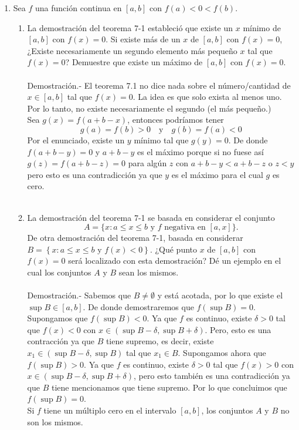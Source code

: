 \begin{enumerate}[\bfseries 1.]
\begin{enumerate}[\bfseries (a)]
	\end{enumerate}

    \item Sea $f$ una función continua en $[a,b]$ con $f(a)<0<f(b)$.

	\begin{enumerate}[\bfseries (a)]

	    \item La demostración del teorema 7-1 estableció que existe un $x$ mínimo de $[a,b]$ con $f(x)=0$. Si existe más de un $x$ de $[a,b]$ con $f(x)=0$, ¿Existe necesariamente un segundo elemento más pequeño $x$ tal que $f(x)=0$? Demuestre que existe un máximo de $[a,b]$ con $f(x)=0$.\\\\
		Demostración.-\; El teorema 7.1 no dice nada sobre el número/cantidad  de $x\in[a,b]$ tal que $f(x)=0$. La idea es que solo exista al menos uno. Por lo tanto, no existe necesariamente el segundo (el más pequeño.)\\
		Sea $g(x)=f(a+b-x)$, entonces podríamos tener 
		$$g(a)=f(b)>0\quad \mbox{y}\quad g(b)=f(a)<0$$ 
		Por el enunciado, existe un $y$ mínimo tal que $g(y)=0$. De donde $f(a+b-y)=0$ y $a+b-y$ es el máximo porque si no fuese así $g(z)=f(a+b-z)=0$ para algún $z$ con $a+b-y<a+b-z$ o $z<y$ pero esto es una contradicción ya que $y$ es el máximo para el cual $g$ es cero.\\\\

	    \item La demostración del teorema 7-1 se basada en considerar el conjunto $$A=\lbrace x:a\leq x \leq b \mbox{ y } f \mbox{ negativa en }[a,x]\rbrace.$$ De otra demostración del teorema 7-1, basada en considerar $B=\left\{x:a\leq x\leq b \mbox{ y } f(x)<0\right\}.$ ¿Qué punto $x$ de $[a,b]$ con $f(x)=0$ será localizado con esta demostración? Dé un ejemplo en el cual los conjuntos $A$ y $B$ sean los mismos.\\\\
		Demostración.-\; Sabemos que $B\neq \emptyset$ y está acotada, por lo que existe el $\sup B \in [a,b]$. De donde demostraremos que $f(\sup B)=0$.\\
		Supongamos que $f(\sup B)<0$. Ya que $f$ es continuo, existe $\delta>0$ tal que $f(x)<0$ con $x\in (\sup B - \delta, \sup B +\delta)$. Pero, esto es una contracción ya que $B$ tiene supremo, es decir, existe $x_1\in (\sup B-\delta, \sup B)$ tal que $x_1\in B$. Supongamos ahora que $f(\sup B)>0$. Ya que $f$ es continuo, existe $\delta>0$ tal que $f(x)>0$ con $x\in (\sup B - \delta, \sup B + \delta)$, pero esto también es una contradicción ya que $B$ tiene mencionamos que tiene supremo. Por lo que concluimos que $f(\sup B)=0$.\\
		Si $f$ tiene un múltiplo cero en el intervalo $[a,b]$, los conjuntos $A$ y $B$ no son los mismos.\\\\


\end{enumerate}
\end{enumerate}

